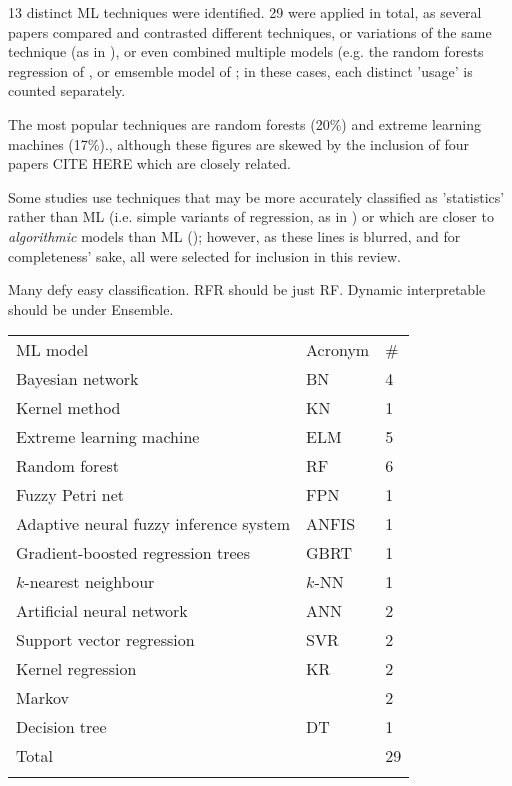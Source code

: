 \documentclass{article}
\begin{document}
13 distinct ML techniques were identified. 29 were applied in total, as several papers compared and contrasted different techniques, or variations of the same technique (as in \cite{lessan_fu_wen_2019}\cite{oneto_fumeo_clerico_canepa_papa_dambra_mazzino_anguita_2016}\cite{milinkovic_markovic_veskovic_ivic_pavlovic_2013}\cite{markovic_milinkovic_tikhonov_schonfeld_2015}), or even combined multiple models (e.g. the random forests regression of \cite{wen_et_al_2017}, or emsemble model of \cite{nair_et_al_2019}; in these cases, each distinct 'usage' is counted separately. 

The most popular techniques are random forests (20\%) and extreme learning machines (17\%)., although these figures are skewed by the inclusion of four papers CITE HERE which are closely related.

Some studies use techniques that may be more accurately classified as 'statistics' rather than ML (i.e. simple variants of regression, as in \cite{pongnumkul_pechprasarn_kunaseth_chaipah_2014}\cite{wang_work_2015}) or which are closer to \textit{algorithmic} models than ML (\cite{hansen_goverde_van_der_meer_2010}); however, as these lines is blurred, and for completeness' sake, all were selected for inclusion in this review.

Many defy easy classification. RFR should be just RF. Dynamic interpretable should be under Ensemble.

\begin{table}[h]
\begin{tabular}{lll}
\noalign{\smallskip}\hline \noalign{\smallskip}
ML model & Acronym & \# \\ 	\noalign{\smallskip}\hline \noalign{\smallskip}
Bayesian network & BN & 4 \\
Kernel method & KN & 1 \\
Extreme learning machine & ELM & 5 \\
Random forest & RF & 6 \\
Fuzzy Petri net & FPN & 1 \\
Adaptive neural fuzzy inference system & ANFIS & 1 \\
Gradient-boosted regression trees & GBRT & 1 \\
$k$-nearest neighbour & $k$-NN & 1 \\
Artificial neural network & ANN & 2 \\
Support vector regression & SVR & 2 \\
Kernel regression & KR & 2 \\
Markov &  & 2 \\
Decision tree & DT & 1 \\ 	\noalign{\smallskip}
Total                                    &         & 29	\\ \noalign{\smallskip} \hline
\end{tabular}
\end{table}
\end{document}
